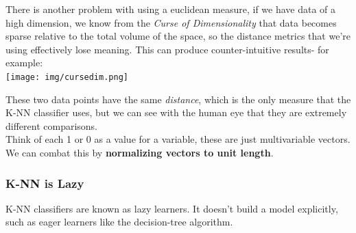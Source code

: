 \documentclass[english, 10pt]{article}
\begin{document}
There is another problem with using a euclidean measure, if we have data of a high dimension, we know from the \textit{Curse of Dimensionality} that data becomes sparse relative to the total volume of the space, so the distance metrics that we're using effectively lose meaning. This can produce counter-intuitive results- for example:\\

{
\centering
\texttt{[image: img/cursedim.png]} 
}

These two data points have the same \textit{distance}, which is the only measure that the K-NN classifier uses, but we can see with the human eye that they are extremely different comparisons.\\

Think of each 1 or 0 as a value for a variable, these are just multivariable vectors.\\

We can combat this by \textbf{normalizing vectors to unit length}.

\subsubsection{K-NN is Lazy}

K-NN classifiers are known as lazy learners. It doesn't build a model explicitly, such as eager learners like the decision-tree algorithm.
\end{document}
